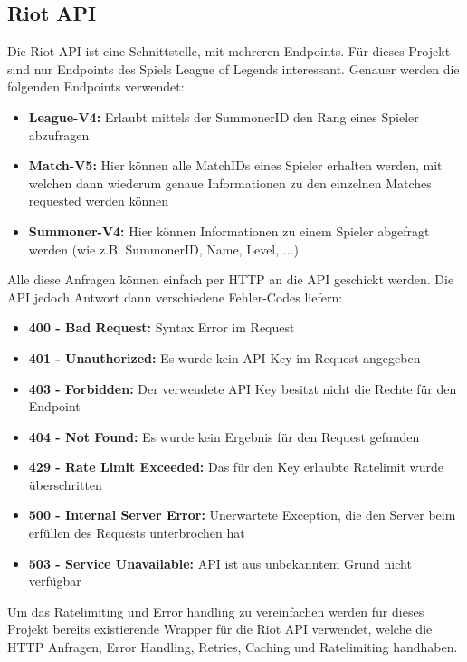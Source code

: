 \subsection{Riot API}\label{riot-api-libraries}
Die Riot API ist eine Schnittstelle, mit mehreren Endpoints. Für dieses Projekt sind nur Endpoints des Spiels League of Legends interessant. Genauer werden die folgenden Endpoints verwendet:
\begin{itemize}
\item \textbf{League-V4:} Erlaubt mittels der SummonerID den Rang eines Spieler abzufragen
\item \textbf{Match-V5:} Hier können alle MatchIDs eines Spieler erhalten werden, mit welchen dann wiederum genaue Informationen zu den einzelnen Matches requested werden können
\item \textbf{Summoner-V4:} Hier können Informationen zu einem Spieler abgefragt werden (wie z.B. SummonerID, Name, Level, ...)
\end{itemize}
Alle diese Anfragen können einfach per HTTP an die API geschickt werden. Die API jedoch Antwort dann verschiedene Fehler-Codes liefern:
\begin{itemize}
\item \textbf{400 - Bad Request:} Syntax Error im Request
\item \textbf{401 - Unauthorized:} Es wurde kein API Key im Request angegeben
\item \textbf{403 - Forbidden:} Der verwendete API Key besitzt nicht die Rechte für den Endpoint
\item \textbf{404 - Not Found:} Es wurde kein Ergebnis für den Request gefunden
\item \textbf{429 - Rate Limit Exceeded:} Das für den Key erlaubte Ratelimit wurde überschritten
\item \textbf{500 - Internal Server Error:} Unerwartete Exception, die den Server beim erfüllen des Requests unterbrochen hat
\item \textbf{503 - Service Unavailable:} API ist aus unbekanntem Grund nicht verfügbar 
\end{itemize}
Um das Ratelimiting und Error handling zu vereinfachen werden für dieses Projekt bereits existierende Wrapper für die Riot API verwendet, welche die HTTP Anfragen, Error Handling, Retries, Caching und Ratelimiting handhaben.
